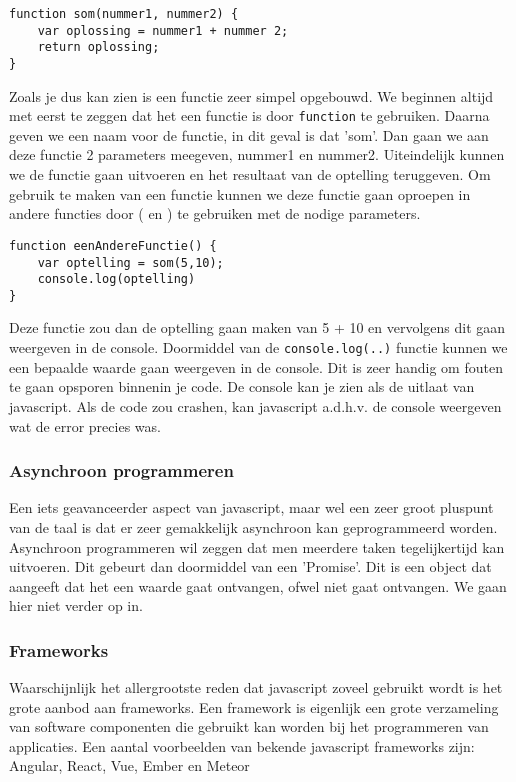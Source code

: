 \begin{lstlisting}[frame=single, caption=Een functie die 2 getallen optelt]
function som(nummer1, nummer2) {
	var oplossing = nummer1 + nummer 2;
	return oplossing;
}
\end{lstlisting}

Zoals je dus kan zien is een functie zeer simpel opgebouwd. We beginnen altijd met eerst te zeggen dat het een functie is door \lstinline[basicstyle=\ttfamily\color{red}]|function| te gebruiken. Daarna geven we een naam voor de functie, in dit geval is dat 'som'. Dan gaan we aan deze functie 2 parameters meegeven, nummer1 en nummer2. Uiteindelijk kunnen we de functie gaan uitvoeren en het resultaat van de optelling teruggeven. Om gebruik te maken van een functie kunnen we deze functie gaan oproepen in andere functies door ( en ) te gebruiken met de nodige parameters.

\begin{lstlisting}[frame=single, caption=Een functie de som functie oproept]
function eenAndereFunctie() {
	var optelling = som(5,10);
	console.log(optelling)
}
\end{lstlisting}

Deze functie zou dan de optelling gaan maken van 5 + 10 en vervolgens dit gaan weergeven in de console. Doormiddel van de \lstinline[basicstyle=\ttfamily\color{red}]|console.log(..)| functie kunnen we een bepaalde waarde gaan weergeven in de console. Dit is zeer handig om fouten te gaan opsporen binnenin je code. De console kan je zien als de uitlaat van javascript. Als de code zou crashen, kan javascript a.d.h.v. de console weergeven wat de error precies was.

\subsubsection{Asynchroon programmeren}
\label{sssec:asynchroon-programmeren}
Een iets geavanceerder aspect van javascript, maar wel een zeer groot pluspunt van de taal is dat er zeer gemakkelijk asynchroon kan geprogrammeerd worden. Asynchroon programmeren wil zeggen dat men meerdere taken tegelijkertijd kan uitvoeren. Dit gebeurt dan doormiddel van een 'Promise'. Dit is een object dat aangeeft dat het een waarde gaat ontvangen, ofwel niet gaat ontvangen. We gaan hier niet verder op in.

\subsubsection{Frameworks}
\label{sssec:frameworks}
Waarschijnlijk het allergrootste reden dat javascript zoveel gebruikt wordt is het grote aanbod aan frameworks. Een framework is eigenlijk een grote verzameling van software componenten die gebruikt kan worden bij het programmeren van applicaties. Een aantal voorbeelden van bekende javascript frameworks zijn: Angular, React, Vue, Ember en Meteor

